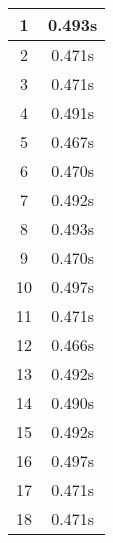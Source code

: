 \documentclass[11pt]{article}
\begin{document}
\begin{table}[!h]
\begin{center}
\begin{minipage}{0.48\textwidth}
\begin{tabular}{| c | c |}
				1 & 0.493s \\ \hline
				2 & 0.471s \\ \hline
				3 & 0.471s \\ \hline
				4 & 0.491s \\ \hline
				5 & 0.467s \\ \hline
				6 & 0.470s \\ \hline
				7 & 0.492s \\ \hline
				8 & 0.493s \\ \hline
				9 & 0.470s \\ \hline
				10 & 0.497s \\ \hline
				11 & 0.471s \\ \hline
				12 & 0.466s \\ \hline
				13 & 0.492s \\ \hline
				14 & 0.490s \\ \hline
				15 & 0.492s \\ \hline
				16 & 0.497s \\ \hline
				17 & 0.471s \\ \hline
				18 & 0.471s \\ \hline
			\end{tabular}
		\end{minipage}
	\end{center}
\end{table}

\pagebreak
\end{document}
